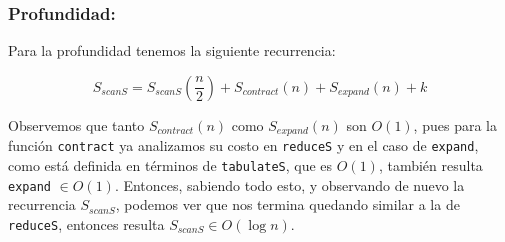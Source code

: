 \documentclass[11pt]{article}
\begin{document}
\subsubsection{Profundidad:}

Para la profundidad tenemos la siguiente recurrencia:

\begin{equation*}
    S_{scanS} = S_{scanS}(\frac{n}{2}) + S_{contract}(n) + S_{expand}(n) + k
\end{equation*}

Observemos que tanto $S_{contract}(n)$ como $S_{expand}(n)$ son $O(1)$, pues
para la función \texttt{contract} ya analizamos su costo en \texttt{reduceS} y en el 
caso de \texttt{expand}, como  está definida en términos de \texttt{tabulateS}, que
es $O(1)$, también resulta \texttt{expand} $\in O(1)$. Entonces, sabiendo todo esto, y observando de nuevo la recurrencia
$S_{scanS}$, podemos ver que nos termina quedando similar a la de \texttt{reduceS}, entonces 
resulta $S_{scanS} \in O(\log{n})$.
\end{document}
